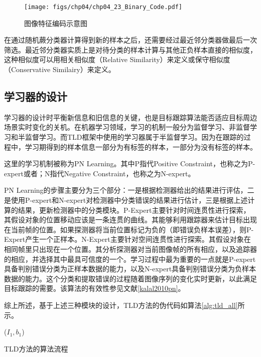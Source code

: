 \begin{figure}[ht]   
	\centering
	\texttt{[image: figs/chp04/chp04\_23\_Binary\_Code.pdf]}
	\caption{图像特征编码示意图}
	\label{fig:chp04_23_Binary_Code}
\end{figure}

在通过随机蕨分类器计算得到新的样本之后，还需要经过最近邻分类器做最后一次筛选。最近邻分类器实质上是对待分类的样本计算与其他正负样本直接的相似度，这种相似度可以用相关相似度（Relative Similarity）来定义或保守相似度（Conservative Similairy）来定义。

\subsection{学习器的设计}
学习器的设计时平衡新信息和旧信息的关键，也是目标跟踪算法能否适应目标周边场景实时变化的关机。在机器学习领域，学习的机制一般分为监督学习、非监督学习和半监督学习。而TLD框架中使用的学习器属于半监督学习。因为在跟踪的过程中，学习期得到的样本信息一部分为有标签的样本，一部分为没有标签的样本。

这里的学习机制被称为PN Learning。其中P指代Positive Constraint，也称之为P-expert或者；N指代Negative Constraint，也称之为N-expert。

PN Learning的步骤主要分为三个部分：一是根据检测器给出的结果进行评估，二是使用P-expert和N-expert对检测器中分类错误的结果进行估计，三是根据上述计算的结果，更新检测器中的分类模块。P-Expert主要针对时间连贯性进行探索，其假设对象的位置移动应该是一条连贯的曲线。其能够利用跟踪器来估计目标出现在当前帧的位置。如果探测器将当前位置标记为负的（即错误负样本误差），则P-Expert产生一个正样本。N-Expert主要针对空间连贯性进行探索。其假设对象在相同帧里只出现在一个位置。其分析探测器对当前图像帧的所有相应，以及追踪器的相应，并选择其中最具可信度的一个。学习过程中最为重要的一点就是P-expert具备判别错误分类为正样本数据的能力，以及N-expert具备判别错误分类为负样本数据的能力。这个分类和提取错误的过程随着图像序列的变化实时更新，以此满足目标跟踪的需要。该算法的有效性参见文献\ref{kalal2010pn}。

综上所述，基于上述三种模块的设计，TLD方法的伪代码如算法\ref{alg:tld_all}所示。
\begin{algorithm2e}[ht]
	\SetAlgoLined
	\BlankLine
	\LearningInitialization($I_1,b_1$)\;	
	\caption{TLD方法的算法流程}
	\label{alg:tld_all}
\end{algorithm2e}

